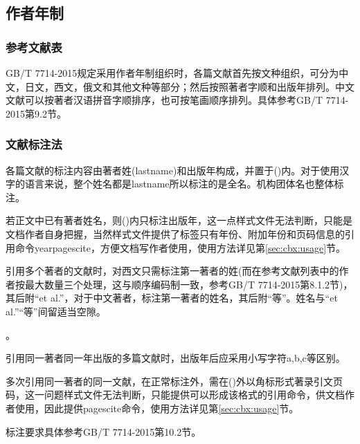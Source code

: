 \subsection{作者年制}

\subsubsection{参考文献表}

GB/T 7714-2015规定采用作者年制组织时，各篇文献首先按文种组织，可分为中文，日文，西文，俄文和其他文种等部分；然后按照著者字顺和出版年排列。中文文献可以按著者汉语拼音字顺排序，也可按笔画顺序排列。具体参考GB/T 7714-2015第9.2节。


\subsubsection{文献标注法}
各篇文献的标注内容由著者姓(lastname)和出版年构成，并置于()内。对于使用汉字的语言来说，整个姓名都是lastname所以标注的是全名。机构团体名也整体标注。

若正文中已有著者姓名，则()内只标注出版年，这一点样式文件无法判断，只能是文档作者自身把握，当然样式文件提供了标签只有年份、附加年份和页码信息的引用命令yearpagescite，方便文档写作者使用，使用方法详见第\ref{sec:cbx:usage}节。

引用多个著者的文献时，对西文只需标注第一著者的姓(而在参考文献列表中的作者按最大数量三个处理，这与顺序编码制一致，参考GB/T 7714-2015第8.1.2节)，其后附“et al.”，对于中文著者，标注第一著者的姓名，其后附“等”。姓名与“et al.”“等”间留适当空隙。

。

引用同一著者同一年出版的多篇文献时，出版年后应采用小写字符a,b,c等区别。

多次引用同一著者的同一文献，在正常标注外，需在()外以角标形式著录引文页码，这一问题样式文件无法判断，只能提供可以形成该格式的引用命令，供文档作者使用，因此提供pagescite命令，使用方法详见第\ref{sec:cbx:usage}节。

标注要求具体参考GB/T 7714-2015第10.2节。


